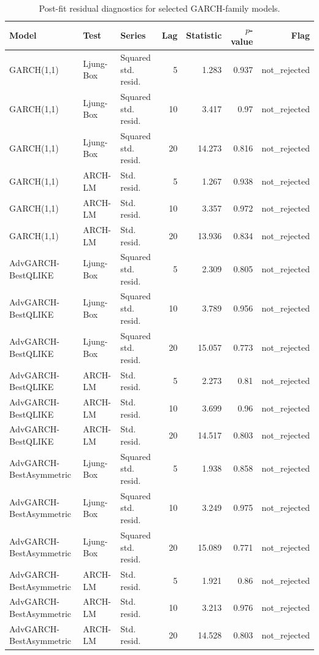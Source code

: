 \begin{table}[!t]
\centering
\caption{Post-fit residual diagnostics for selected GARCH-family models.}
\label{tab:garch-residual-diagnostics}
\scriptsize
\begin{tabular}{@{}L{0.20\textwidth}L{0.10\textwidth}L{0.19\textwidth}rrrr@{}}
\toprule
Model & Test & Series & Lag & Statistic & \(p\)-value & Flag \\
\midrule
GARCH(1,1) & Ljung-Box & Squared std. resid. & 5 & 1.283 & 0.937 & not\_rejected \\
GARCH(1,1) & Ljung-Box & Squared std. resid. & 10 & 3.417 & 0.97 & not\_rejected \\
GARCH(1,1) & Ljung-Box & Squared std. resid. & 20 & 14.273 & 0.816 & not\_rejected \\
GARCH(1,1) & ARCH-LM & Std. resid. & 5 & 1.267 & 0.938 & not\_rejected \\
GARCH(1,1) & ARCH-LM & Std. resid. & 10 & 3.357 & 0.972 & not\_rejected \\
GARCH(1,1) & ARCH-LM & Std. resid. & 20 & 13.936 & 0.834 & not\_rejected \\
AdvGARCH-BestQLIKE & Ljung-Box & Squared std. resid. & 5 & 2.309 & 0.805 & not\_rejected \\
AdvGARCH-BestQLIKE & Ljung-Box & Squared std. resid. & 10 & 3.789 & 0.956 & not\_rejected \\
AdvGARCH-BestQLIKE & Ljung-Box & Squared std. resid. & 20 & 15.057 & 0.773 & not\_rejected \\
AdvGARCH-BestQLIKE & ARCH-LM & Std. resid. & 5 & 2.273 & 0.81 & not\_rejected \\
AdvGARCH-BestQLIKE & ARCH-LM & Std. resid. & 10 & 3.699 & 0.96 & not\_rejected \\
AdvGARCH-BestQLIKE & ARCH-LM & Std. resid. & 20 & 14.517 & 0.803 & not\_rejected \\
AdvGARCH-BestAsymmetric & Ljung-Box & Squared std. resid. & 5 & 1.938 & 0.858 & not\_rejected \\
AdvGARCH-BestAsymmetric & Ljung-Box & Squared std. resid. & 10 & 3.249 & 0.975 & not\_rejected \\
AdvGARCH-BestAsymmetric & Ljung-Box & Squared std. resid. & 20 & 15.089 & 0.771 & not\_rejected \\
AdvGARCH-BestAsymmetric & ARCH-LM & Std. resid. & 5 & 1.921 & 0.86 & not\_rejected \\
AdvGARCH-BestAsymmetric & ARCH-LM & Std. resid. & 10 & 3.213 & 0.976 & not\_rejected \\
AdvGARCH-BestAsymmetric & ARCH-LM & Std. resid. & 20 & 14.528 & 0.803 & not\_rejected \\
\bottomrule
\end{tabular}
\end{table}
